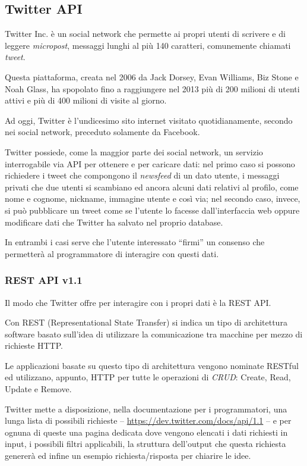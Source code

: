 \subsection{Twitter API}
	Twitter Inc. è un social network che permette ai propri utenti di scrivere e di leggere \emph{micropost}, messaggi lunghi al più 140 caratteri, comunemente chiamati \emph{tweet}. 

	Questa piattaforma, creata nel 2006 da Jack Dorsey, Evan Williams, Biz Stone e Noah Glass, ha spopolato fino a raggiungere nel 2013 più di 200 milioni di utenti attivi e più di 400 milioni di visite al giorno\cite{twitter_data}.

	Ad oggi, Twitter è l'undicesimo sito internet visitato quotidianamente, secondo nei social network, preceduto solamente da Facebook\cite{twitter_alexa}.

	Twitter possiede, come la maggior parte dei social network, un servizio interrogabile via API per ottenere e per caricare dati: nel primo caso si possono richiedere i tweet che compongono il \emph{newsfeed} di un dato utente, i messaggi privati che due utenti si scambiano ed ancora alcuni dati relativi al profilo, come nome e cognome, nickname, immagine utente e così via; nel secondo caso, invece, si può pubblicare un tweet come se l'utente lo facesse dall'interfaccia web oppure modificare dati che Twitter ha salvato nel proprio database. 

	In entrambi i casi serve che l'utente interessato ``firmi'' un consenso che permetterà al programmatore di interagire con questi dati. 

	\subsubsection{REST API v1.1}
		Il modo che Twitter offre per interagire con i propri dati è la REST API. 
	
		Con REST (Representational State Transfer) si indica un tipo di architettura software basato sull'idea di utilizzare la comunicazione tra macchine per mezzo di richieste HTTP.

		Le applicazioni basate su questo tipo di architettura vengono nominate RESTful ed utilizzano, appunto, HTTP per tutte le operazioni di \emph{CRUD}: Create, Read, Update e Remove.

		Twitter mette a disposizione, nella documentazione per i programmatori\cite{twitter_doc}, una lunga lista di possibili richieste -- \url{https://dev.twitter.com/docs/api/1.1} -- e per ognuna di queste una pagina dedicata dove vengono elencati i dati richiesti in input, i possibili filtri applicabili, la struttura dell'output che questa richiesta genererà ed infine un esempio richiesta/risposta per chiarire le idee.


